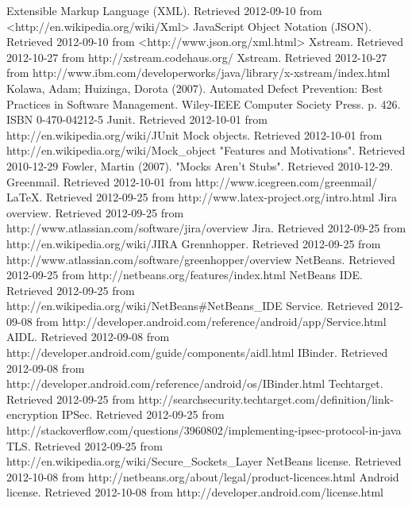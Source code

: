 \documentclass[12pt]{report}
\begin{document}
\begin{thebibliography}{99}
 Extensible Markup Language (XML). Retrieved 2012-09-10 from <http://en.wikipedia.org/wiki/Xml>
 JavaScript Object Notation (JSON). Retrieved 2012-09-10 from <http://www.json.org/xml.html>
 Xstream. Retrieved 2012-10-27 from http://xstream.codehaus.org/
 Xstream. Retrieved 2012-10-27 from http://www.ibm.com/developerworks/java/library/x-xstream/index.html
 Kolawa, Adam; Huizinga, Dorota (2007). Automated Defect Prevention: Best Practices in Software Management. Wiley-IEEE Computer Society Press. p. 426. ISBN 0-470-04212-5
 Junit. Retrieved 2012-10-01 from http://en.wikipedia.org/wiki/JUnit
 Mock objects. Retrieved 2012-10-01 from http://en.wikipedia.org/wiki/Mock\_object
 "Features and Motivations". Retrieved 2010-12-29
 Fowler, Martin (2007). "Mocks Aren't Stubs". Retrieved 2010-12-29.
 Greenmail. Retrieved 2012-10-01 from http://www.icegreen.com/greenmail/
 LaTeX. Retrieved 2012-09-25 from http://www.latex-project.org/intro.html
 Jira overview. Retrieved 2012-09-25 from http://www.atlassian.com/software/jira/overview
 Jira. Retrieved 2012-09-25 from http://en.wikipedia.org/wiki/JIRA
 Grennhopper. Retrieved 2012-09-25 from http://www.atlassian.com/software/greenhopper/overview
 NetBeans. Retrieved 2012-09-25 from http://netbeans.org/features/index.html
 NetBeans IDE. Retrieved 2012-09-25 from http://en.wikipedia.org/wiki/NetBeans\#NetBeans\_IDE
 Service. Retrieved 2012-09-08 from http://developer.android.com/reference/android/app/Service.html
 AIDL. Retrieved 2012-09-08 from http://developer.android.com/guide/components/aidl.html
 IBinder. Retrieved 2012-09-08 from http://developer.android.com/reference/android/os/IBinder.html
 Techtarget. Retrieved 2012-09-25 from http://searchsecurity.techtarget.com/definition/link-encryption
 IPSec. Retrieved 2012-09-25 from http://stackoverflow.com/questions/3960802/implementing-ipsec-protocol-in-java
 TLS. Retrieved 2012-09-25 from http://en.wikipedia.org/wiki/Secure\_Sockets\_Layer
 NetBeans license. Retrieved 2012-10-08 from http://netbeans.org/about/legal/product-licences.html
 Android license. Retrieved 2012-10-08 from http://developer.android.com/license.html

\end{thebibliography}
\end{document}
